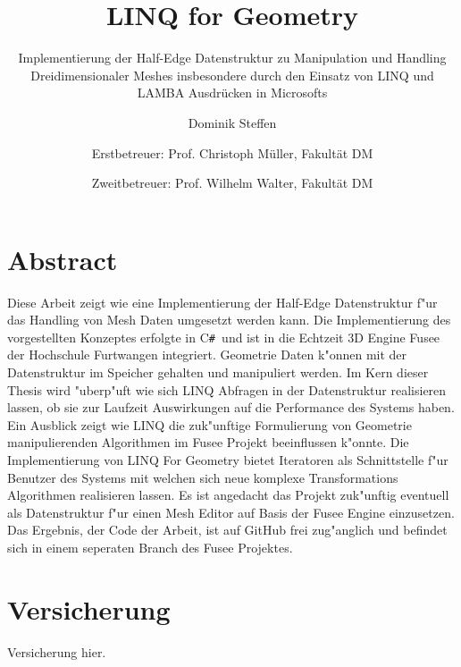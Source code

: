 \documentclass[pagesize, paper=a4, fontsize=12pt,titlepage=true, headings=small, headnosepline, abstractoff, liststotoc, nochapterprefix, plainheadsepline]{scrreprt}
\author{
Dominik Steffen \and
Erstbetreuer: Prof. Christoph Müller, Fakultät DM \and
Zweitbetreuer: Prof. Wilhelm Walter, Fakultät DM
}
\title{LINQ for Geometry}
\subtitle{Implementierung der Half-Edge Datenstruktur zu Manipulation und Handling Dreidimensionaler Meshes insbesondere durch den Einsatz von LINQ und LAMBA Ausdrücken in Microsofts \CS}
\newcommand{\CSS}{C\texttt{\# }}
\newcommand{\LFGS}{LINQ For Geometry }
\begin{document}
\maketitle

\begingroup

\newpage
\pagestyle{empty}
\renewcommand*{\chapterpagestyle}{empty}
\chapter*{Abstract}%
%
Diese Arbeit zeigt wie eine Implementierung der Half-Edge Datenstruktur f"ur das Handling von Mesh Daten umgesetzt werden kann. Die Implementierung des vorgestellten Konzeptes erfolgte in \CSS und ist in die Echtzeit 3D Engine Fusee der Hochschule Furtwangen integriert. Geometrie Daten k"onnen mit der Datenstruktur im Speicher gehalten und manipuliert werden. Im Kern dieser Thesis wird "uberp"uft wie sich LINQ Abfragen in der Datenstruktur realisieren lassen, ob sie  zur Laufzeit Auswirkungen auf die Performance des Systems haben. Ein Ausblick zeigt wie LINQ die zuk"unftige Formulierung von Geometrie manipulierenden Algorithmen im Fusee Projekt beeinflussen k"onnte. Die Implementierung von \LFGS bietet Iteratoren als Schnittstelle f"ur Benutzer des Systems mit welchen sich neue komplexe Transformations Algorithmen realisieren lassen. Es ist angedacht das Projekt zuk"unftig eventuell als Datenstruktur f"ur einen Mesh Editor auf Basis der Fusee Engine einzusetzen. Das Ergebnis, der Code der Arbeit, ist auf GitHub frei zug"anglich und befindet sich in einem seperaten Branch des Fusee Projektes.
\clearpage
\endgroup

\begingroup

\newpage
\pagestyle{empty}
\renewcommand*{\chapterpagestyle}{empty}
\chapter*{Versicherung}%
%
Versicherung hier.
\clearpage
\endgroup
\end{document}
